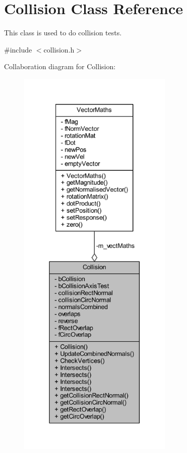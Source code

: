 \hypertarget{class_collision}{}\section{Collision Class Reference}
\label{class_collision}


This class is used to do collision tests.  




{\ttfamily \#include $<$collision.\+h$>$}



Collaboration diagram for Collision\+:\nopagebreak
\begin{figure}[H]
\begin{center}
\leavevmode
\includegraphics[height=550pt]{class_collision__coll__graph}
\end{center}
\end{figure}
